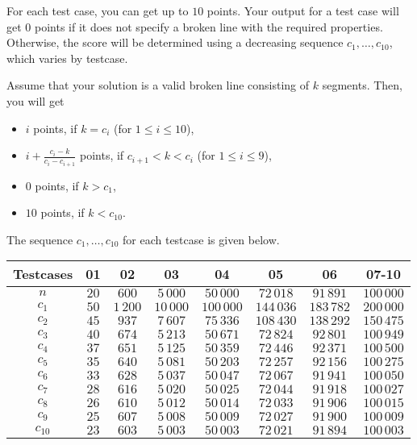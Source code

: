 For each test case, you can get up to $10$ points.
Your output for a test case will get $0$ points if it does not specify a broken line with the required properties.
Otherwise, the score will be determined using a decreasing sequence $c_1, \ldots, c_{10}$, which varies by testcase.

Assume that your solution is a valid broken line consisting of $k$ segments. Then, you will get
\begin{itemize}
\item $i$ points, if $k = c_i$ (for $1 \leq i \leq 10$),
\item $i + \frac{c_i - k}{c_i - c_{i+1}}$  points, if $c_{i+1} < k < c_i$ (for $1 \leq i \leq 9$),
\item $0$ points, if $k > c_1$,
\item $10$ points, if $k < c_{10}$.
\end{itemize}

The sequence $c_1, \ldots, c_{10}$ for each testcase is given below.

\begin{center}
\renewcommand{\arraystretch}{1.5}
\begin{tabular}{|c|c|c|c|c|c|c|c|}
\hline
Testcases & 01 & 02 & 03 & 04 & 05 & 06 & 07-10 \\
\hline
$n$ & $20$ & $600$ & $5\,000$ & $50\,000$ & $72\,018$ & $91\,891$ & $100\,000$ \\
\hline
$c_{1}$ & $50$ & $1\,200$ & $10\,000$ & $100\,000$ & $144\,036$ & $183\,782$ & $200\,000$ \\
\hline
$c_{2}$&$45$&$937$&$7\,607$&$75\,336$&$108\,430$&$138\,292$&$150\,475$ \\
\hline
$c_{3}$&$40$&$674$&$5\,213$&$50\,671$&$72\,824$&$92\,801$&$100\,949$ \\
\hline
$c_{4}$&$37$&$651$&$5\,125$&$50\,359$&$72\,446$&$92\,371$&$100\,500$ \\
\hline
$c_{5}$&$35$&$640$&$5\,081$&$50\,203$&$72\,257$&$92\,156$&$100\,275$ \\
\hline
$c_{6}$&$33$&$628$&$5\,037$&$50\,047$&$72\,067$&$91\,941$&$100\,050$ \\
\hline
$c_{7}$&$28$&$616$&$5\,020$&$50\,025$&$72\,044$&$91\,918$&$100\,027$ \\ 
\hline
$c_{8}$&$26$&$610$&$5\,012$&$50\,014$&$72\,033$&$91\,906$&$100\,015$ \\
\hline
$c_{9}$&$25$&$607$&$5\,008$&$50\,009$&$72\,027$&$91\,900$&$100\,009$ \\
\hline 
$c_{10}$&$23$&$603$&$5\,003$&$50\,003$&$72\,021$&$91\,894$&$100\,003$ \\
\hline
\end{tabular}
\end{center}